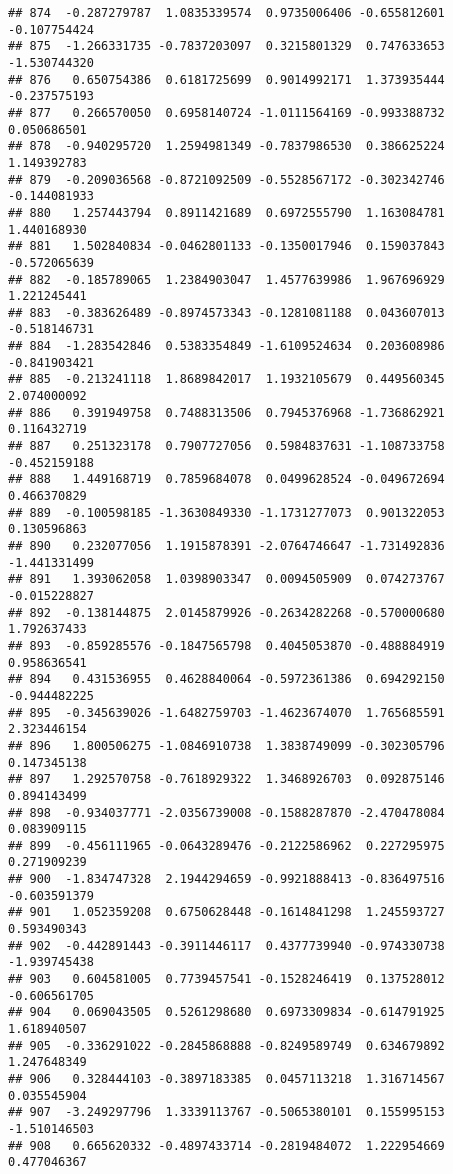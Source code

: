\documentclass[
]{article}
\begin{document}
\begin{verbatim}
## 874  -0.287279787  1.0835339574  0.9735006406 -0.655812601 -0.107754424
## 875  -1.266331735 -0.7837203097  0.3215801329  0.747633653 -1.530744320
## 876   0.650754386  0.6181725699  0.9014992171  1.373935444 -0.237575193
## 877   0.266570050  0.6958140724 -1.0111564169 -0.993388732  0.050686501
## 878  -0.940295720  1.2594981349 -0.7837986530  0.386625224  1.149392783
## 879  -0.209036568 -0.8721092509 -0.5528567172 -0.302342746 -0.144081933
## 880   1.257443794  0.8911421689  0.6972555790  1.163084781  1.440168930
## 881   1.502840834 -0.0462801133 -0.1350017946  0.159037843 -0.572065639
## 882  -0.185789065  1.2384903047  1.4577639986  1.967696929  1.221245441
## 883  -0.383626489 -0.8974573343 -0.1281081188  0.043607013 -0.518146731
## 884  -1.283542846  0.5383354849 -1.6109524634  0.203608986 -0.841903421
## 885  -0.213241118  1.8689842017  1.1932105679  0.449560345  2.074000092
## 886   0.391949758  0.7488313506  0.7945376968 -1.736862921  0.116432719
## 887   0.251323178  0.7907727056  0.5984837631 -1.108733758 -0.452159188
## 888   1.449168719  0.7859684078  0.0499628524 -0.049672694  0.466370829
## 889  -0.100598185 -1.3630849330 -1.1731277073  0.901322053  0.130596863
## 890   0.232077056  1.1915878391 -2.0764746647 -1.731492836 -1.441331499
## 891   1.393062058  1.0398903347  0.0094505909  0.074273767 -0.015228827
## 892  -0.138144875  2.0145879926 -0.2634282268 -0.570000680  1.792637433
## 893  -0.859285576 -0.1847565798  0.4045053870 -0.488884919  0.958636541
## 894   0.431536955  0.4628840064 -0.5972361386  0.694292150 -0.944482225
## 895  -0.345639026 -1.6482759703 -1.4623674070  1.765685591  2.323446154
## 896   1.800506275 -1.0846910738  1.3838749099 -0.302305796  0.147345138
## 897   1.292570758 -0.7618929322  1.3468926703  0.092875146  0.894143499
## 898  -0.934037771 -2.0356739008 -0.1588287870 -2.470478084  0.083909115
## 899  -0.456111965 -0.0643289476 -0.2122586962  0.227295975  0.271909239
## 900  -1.834747328  2.1944294659 -0.9921888413 -0.836497516 -0.603591379
## 901   1.052359208  0.6750628448 -0.1614841298  1.245593727  0.593490343
## 902  -0.442891443 -0.3911446117  0.4377739940 -0.974330738 -1.939745438
## 903   0.604581005  0.7739457541 -0.1528246419  0.137528012 -0.606561705
## 904   0.069043505  0.5261298680  0.6973309834 -0.614791925  1.618940507
## 905  -0.336291022 -0.2845868888 -0.8249589749  0.634679892  1.247648349
## 906   0.328444103 -0.3897183385  0.0457113218  1.316714567  0.035545904
## 907  -3.249297796  1.3339113767 -0.5065380101  0.155995153 -1.510146503
## 908   0.665620332 -0.4897433714 -0.2819484072  1.222954669  0.477046367

\end{verbatim}
\end{document}
